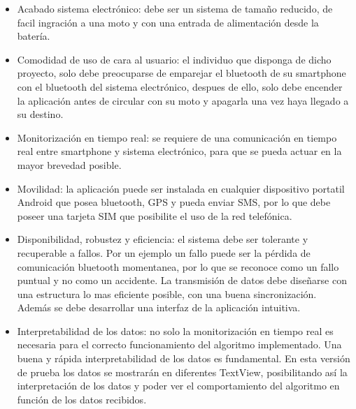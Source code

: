 		\begin{itemize}
			\item Acabado sistema electrónico: debe ser un sistema de tamaño reducido, de facil ingración a una moto y con una entrada de alimentación desde la batería.
			
			\item Comodidad de uso de cara al usuario: el individuo que disponga de dicho proyecto, solo debe preocuparse de emparejar el bluetooth de su smartphone con el bluetooth del sistema electrónico, despues de ello, solo debe encender la aplicación antes de circular con su moto y apagarla una vez haya llegado a su destino. 
			
			\item Monitorización en tiempo real: se requiere de una comunicación en tiempo real entre smartphone y sistema electrónico, para que se pueda actuar en la mayor brevedad posible.
			
			\item Movilidad: la aplicación puede ser instalada en cualquier dispositivo portatil Android que posea bluetooth, GPS y pueda enviar SMS, por lo que debe poseer una tarjeta SIM que posibilite el uso de la red telefónica.
			
			\item Disponibilidad, robustez y eficiencia: el sistema debe ser tolerante y recuperable a fallos. Por un ejemplo un fallo puede ser la pérdida de comunicación bluetooth momentanea, por lo que se reconoce como un fallo puntual y no como un accidente. La transmisión de datos debe diseñarse con una estructura lo mas eficiente posible, con una buena sincronización. Además se debe desarrollar una interfaz de la aplicación intuitiva.
			
			\item Interpretabilidad de los datos: no solo la monitorización en tiempo real es necesaria para el correcto funcionamiento del algoritmo implementado. Una buena y rápida interpretabilidad de los datos es fundamental. En esta versión de prueba los datos se mostrarán en diferentes TextView, posibilitando así la interpretación de los datos y poder ver el comportamiento del algoritmo en función de los datos recibidos.
			
		\end{itemize}


	\newpage
	$\ $